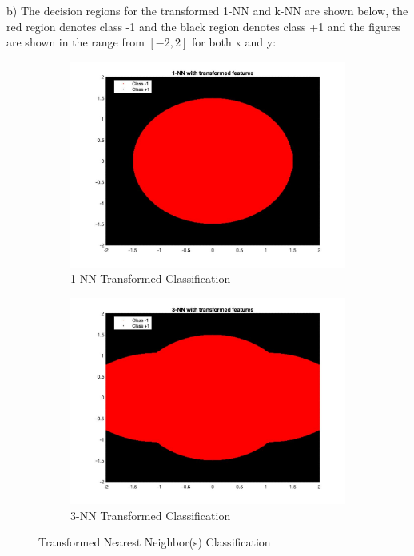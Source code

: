 \documentclass[12pt]{article}
\begin{document}
b) The decision regions for the transformed 1-NN and k-NN are shown below, the red region denotes class -1 and the black region denotes class +1 and the figures are shown in the range from $\left[-2, 2\right]$ for both x and y:
\begin{figure}[H]
\centering
\begin{subfigure}{.5\textwidth}
  \centering
   \includegraphics[scale = 0.22]{3.jpg}
  \caption{1-NN Transformed Classification}
  \label{fig:3}
\end{subfigure}%
\begin{subfigure}{.5\textwidth}
  \centering
   \includegraphics[scale = 0.22]{4.jpg}
  \caption{3-NN Transformed Classification}
  \label{fig:4}
\end{subfigure}
\caption{Transformed Nearest Neighbor(s) Classification}
\label{fig:test}
\end{figure}
\end{document}
